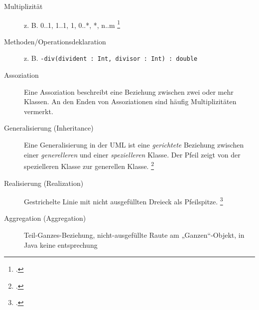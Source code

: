 \documentclass{lehramt-informatik}
\begin{document}
\begin{description}
\item[Multiplizität]
z. B. 0..1, 1..1, 1, 0..*, *, n..m
\footcite[Seite 98 (PDF 115)]{uml}

%

\item[Methoden/Operationsdeklaration]
z. B. \verb|-div(divident : Int, divisor : Int) : double|

%

\item[Assoziation] Eine Assoziation beschreibt eine Beziehung zwischen
zwei oder mehr Klassen. An den Enden von Assoziationen sind häufig
Multiplizitäten vermerkt.


%

\item[Generalisierung (Inheritance)] Eine Generalisierung in der UML ist
eine \emph{gerichtete} Beziehung zwischen einer \emph{generelleren} und
einer \emph{spezielleren} Klasse. Der Pfeil zeigt von der spezielleren
Klasse zur generellen Klasse.
\footcite[Kapitel 6.4.6 Generalisierung, Seite 135]{rupp}


\item[Realisierung (Realization)] Gestrichelte Linie mit nicht
ausgefüllten Dreieck als Pfeilspitze. 
\footcite[Kapitel 6.4.13, Seite 164]{rupp}


%

\item[Aggregation (Aggregation)]
Teil-Ganzes-Beziehung, nicht-ausgefüllte Raute am „Ganzen“-Objekt,
in Java keine entsprechung



\end{description}
\end{document}

